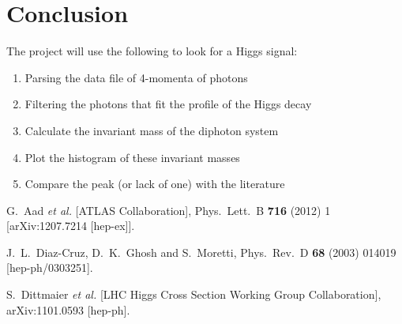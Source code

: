 \documentclass{article}
\begin{document}
\section{Conclusion}
The project will use the following to look for a Higgs signal:
\begin{enumerate}
\item Parsing the data file of 4-momenta of photons
\item Filtering the photons that fit the profile of the Higgs decay
\item Calculate the invariant mass of the diphoton system
\item Plot the histogram of these invariant masses
\item Compare the peak (or lack of one) with the literature
\end{enumerate}
\begin{thebibliography}{9}

  G.~Aad {\it et al.}  [ATLAS Collaboration],
  Phys.\ Lett.\ B {\bf 716} (2012) 1
  [arXiv:1207.7214 [hep-ex]].
  
  J.~L.~Diaz-Cruz, D.~K.~Ghosh and S.~Moretti,
  Phys.\ Rev.\ D {\bf 68} (2003) 014019
  [hep-ph/0303251].

  S.~Dittmaier {\it et al.}  [LHC Higgs Cross Section Working Group Collaboration],
  arXiv:1101.0593 [hep-ph].


\end{thebibliography}
\end{document}

